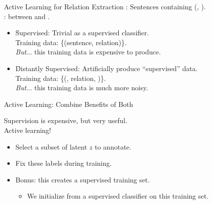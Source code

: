 \begin{frame}{Active Learning for Relation Extraction}
  :  Sentences containing (, ). \\
  :  between  and .
  \pause
  \vspace{1cm}

   \begin{itemize}
    \item \h{Supervised:} Trivial as a supervised classifier. \\
      Training data: \{(sentence, relation)\}. \\
      \textit{But}$\dots$ \pause this training data is expensive to produce.
    \pause
    \vspace{0.5cm}
  
    \item \h{Distantly Supervised:} Artificially produce ``supervised'' data. \\
      Training data: \{(, relation, )\}. \\
      \textit{But}$\dots$ \pause this training data is much more noisy.
  \end{itemize}
\end{frame}

\begin{frame}{Active Learning: Combine Benefits of Both}
\begin{center}
\end{center}
\vspace{0.5cm}
\pause

  Supervision is expensive,
  but very useful. \\
\vspace{0.25cm}
 Active learning! \\
\pause
\begin{itemize}
  \item Select a subset of latent $z$ to annotate.
  \item Fix these labels during training.
  \pause
  \item Bonus: this creates a supervised training set.
  \begin{itemize}
    \item We initialize from a supervised classifier on this training set.
  \end{itemize}
\end{itemize}

\end{frame}

